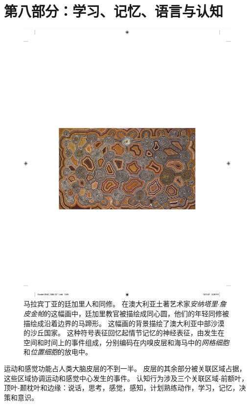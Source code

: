\chapter*{第八部分：学习、记忆、语言与认知}


\begin{figure}[htbp]
	\centering
	\includegraphics[width=1.0\linewidth]{chap52/fig_52_0}
	\caption{马拉宾丁亚的廷加里人和同修。
		在澳大利亚土著艺术家\textit{安纳塔里$\cdot$詹皮金帕}的这幅画中，廷加里教官被描绘成同心圆，他们的年轻同修被描绘成沿着边界的马蹄形。
		这幅画的背景描绘了澳大利亚中部沙漠的沙丘国家。
		这种符号表征回忆起情节记忆的神经表征，由发生在空间和时间上的事件组成，分别编码在内嗅皮层和海马中的\textit{网格细胞}和\textit{位置细胞}的放电中。}
	\label{fig:52_0}
\end{figure}


运动和感觉功能占人类大脑皮层的不到一半。
皮层的其余部分被关联区域占据，这些区域协调运动和感觉中心发生的事件。
认知行为涉及三个关联区域-前额叶，顶叶-颞枕叶和边缘：说话，思考，感觉，感知，计划熟练动作，学习，记忆，决策和意识。


